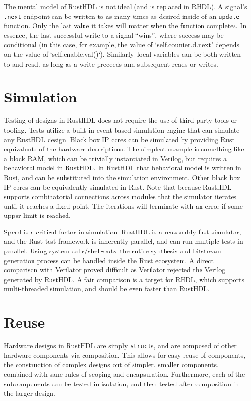 \documentclass[sigplan,screen,sigconf]{acmart}
\begin{document}
The mental model of RustHDL is not ideal (and is replaced in RHDL).  A signal's \verb|.next| endpoint can be written 
to as many times as desired inside of an \verb|update| function.  Only the last value it takes will
matter when the function completes.  In essence, the last successful write to a signal ``wins'', where
success may be conditional (in this case, for example, the value of `self.counter.d.next' depends on 
the value of `self.enable.val()`).  Similarly, local variables can be both written to and read, as long as 
a write preceeds and subsequent reads or writes.

\section{Simulation}
Testing of designs in RustHDL does not require the use of third party tools or tooling.  
Tests utilize a built-in event-based simulation engine that can simulate any RustHDL design.
Black box IP cores can be simulated by providing Rust equivalents of the hardware descriptions.
The simplest example is something like a block RAM, which can be trivially instantiated in 
Verilog, but requires a behavioral model in RustHDL.  In RustHDL that behavioral model is 
written in Rust, and can be substituted into the simulation environment.  Other black box
IP cores can be equivalently simulated in Rust.  Note that because RustHDL supports combinatorial
connections across modules that the simulator iterates until it reaches a fixed point.  The 
iterations will terminate with an error if some upper limit is reached.

Speed is a critical factor in simulation.  RustHDL is a reasonably fast simulator, 
and the Rust test framework is inherently parallel, and can run multiple tests in parallel. 
Using system calls/shell-outs, the entire synthesis and bitstream generation process 
can be handled inside the Rust ecosystem.  A direct comparison with Verilator proved difficult
as Verilator rejected the Verilog generated by RustHDL.  A fair comparison is a target for RHDL,
which supports multi-threaded simulation, and should be even faster than RustHDL.

\section{Reuse}
Hardware designs in RustHDL are simply \verb|struct|s, and are composed of other 
hardware components via composition.  This allows for easy reuse of components, the
construction of complex designs out of simpler, smaller components, combined with sane rules of
scoping and encapsulation.  Furthermore, each of the subcomponents can be tested in 
isolation, and then tested after composition in the larger design. 
\end{document}
